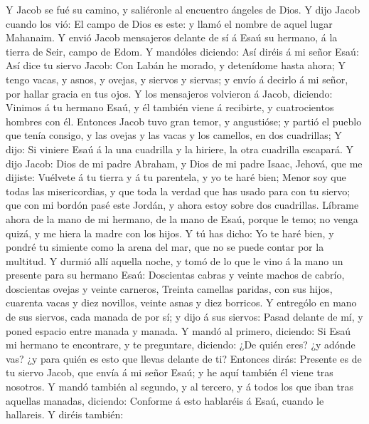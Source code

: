  Y Jacob se fué su camino, y saliéronle al encuentro
ángeles de Dios.  Y dijo Jacob cuando los vió: El campo de
Dios es este: y llamó el nombre de aquel lugar Mahanaim. 
Y envió Jacob mensajeros delante de sí á Esaú su hermano, á la tierra de
Seir, campo de Edom.  Y mandóles diciendo: Así diréis á mi
señor Esaú: Así dice tu siervo Jacob: Con Labán he morado, y detenídome
hasta ahora;  Y tengo vacas, y asnos, y ovejas, y siervos
y siervas; y envío á decirlo á mi señor, por hallar gracia en tus ojos.
 Y los mensajeros volvieron á Jacob, diciendo: Vinimos á
tu hermano Esaú, y él también viene á recibirte, y cuatrocientos hombres
con él.  Entonces Jacob tuvo gran temor, y angustióse; y
partió el pueblo que tenía consigo, y las ovejas y las vacas y los
camellos, en dos cuadrillas;  Y dijo: Si viniere Esaú á la
una cuadrilla y la hiriere, la otra cuadrilla escapará.  Y
dijo Jacob: Dios de mi padre Abraham, y Dios de mi padre Isaac, Jehová,
que me dijiste: Vuélvete á tu tierra y á tu parentela, y yo te haré
bien;  Menor soy que todas las misericordias, y que toda
la verdad que has usado para con tu siervo; que con mi bordón pasé este
Jordán, y ahora estoy sobre dos cuadrillas.  Líbrame
ahora de la mano de mi hermano, de la mano de Esaú, porque le temo; no
venga quizá, y me hiera la madre con los hijos.  Y tú has
dicho: Yo te haré bien, y pondré tu simiente como la arena del mar, que
no se puede contar por la multitud.  Y durmió allí
aquella noche, y tomó de lo que le vino á la mano un presente para su
hermano Esaú:  Doscientas cabras y veinte machos de
cabrío, doscientas ovejas y veinte carneros,  Treinta
camellas paridas, con sus hijos, cuarenta vacas y diez novillos, veinte
asnas y diez borricos.  Y entrególo en mano de sus
siervos, cada manada de por sí; y dijo á sus siervos: Pasad delante de
mí, y poned espacio entre manada y manada.  Y mandó al
primero, diciendo: Si Esaú mi hermano te encontrare, y te preguntare,
diciendo: ¿De quién eres? ¿y adónde vas? ¿y para quién es esto que
llevas delante de ti?  Entonces dirás: Presente es de tu
siervo Jacob, que envía á mi señor Esaú; y he aquí también él viene tras
nosotros.  Y mandó también al segundo, y al tercero, y á
todos los que iban tras aquellas manadas, diciendo: Conforme á esto
hablaréis á Esaú, cuando le hallareis.  Y diréis también:

